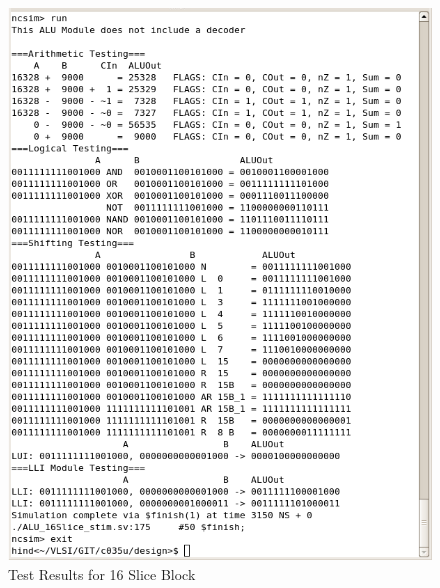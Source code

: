 \begin{figure}[h]
	\centering
	\includegraphics[scale=0.72]{results/ALUBlock.png}
	\caption{Test Results for 16 Slice Block}
	\label{fig:ALUBlockRes}
\end{figure}

